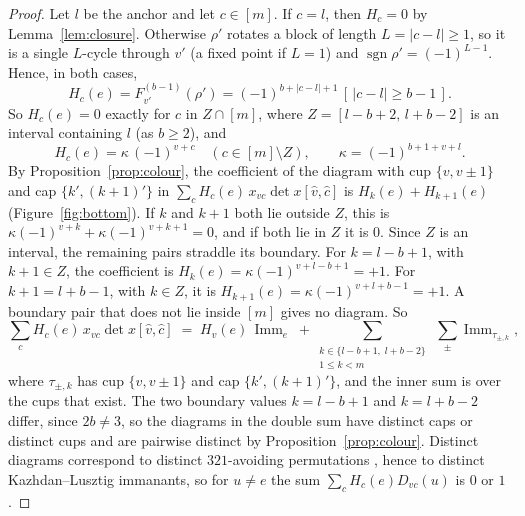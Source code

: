 \documentclass[11pt]{amsart}
\theoremstyle{definition}
\theoremstyle{remark}
\newcommand{\Imm}{\operatorname{Imm}}
\newcommand{\sgn}{\operatorname{sgn}}
\begin{document}
\begin{proof}
Let $l$ be the anchor and let $c\in[m]$. If $c=l$, then $H_c=0$ by Lemma~\ref{lem:closure}. Otherwise $\rho'$ rotates a block of length $L=|c-l|\ge1$, so it is a single $L$-cycle through $v'$ (a fixed point if $L=1$) and $\sgn\rho'=(-1)^{L-1}$. Hence, in both cases,
\[
H_c(e)=F^{(b-1)}_{v'}(\rho')=(-1)^{b+|c-l|+1}\,[\,|c-l|\ge b-1\,].
\]
So $H_c(e)=0$ exactly for $c$ in $Z\cap[m]$, where $Z=[l-b+2,\,l+b-2]$ is an interval containing $l$ (as $b\ge2$), and
\[
H_c(e)=\kappa\,(-1)^{v+c}\quad(c\in[m]\setminus Z),\qquad \kappa=(-1)^{b+1+v+l}.
\]
By Proposition~\ref{prop:colour}, the coefficient of the diagram with cup $\{v,v\pm1\}$ and cap $\{k',(k+1)'\}$ in $\sum_cH_c(e)\,x_{vc}\det x[\hat v,\hat c]$ is $H_k(e)+H_{k+1}(e)$ (Figure~\ref{fig:bottom}). If $k$ and $k+1$ both lie outside $Z$, this is $\kappa(-1)^{v+k}+\kappa(-1)^{v+k+1}=0$, and if both lie in $Z$ it is $0$. Since $Z$ is an interval, the remaining pairs straddle its boundary. For $k=l-b+1$, with $k+1\in Z$, the coefficient is $H_k(e)=\kappa(-1)^{v+l-b+1}=+1$. For $k+1=l+b-1$, with $k\in Z$, it is $H_{k+1}(e)=\kappa(-1)^{v+l+b-1}=+1$. A boundary pair that does not lie inside $[m]$ gives no diagram. So
\[
\sum_cH_c(e)\,x_{vc}\det x[\hat v,\hat c]\;=\;H_v(e)\,\Imm_e\;+\sum_{\substack{k\in\{l-b+1,\;l+b-2\}\\1\le k<m}}\ \sum_{\pm}\Imm_{\tau_{\pm,k}},
\]
where $\tau_{\pm,k}$ has cup $\{v,v\pm1\}$ and cap $\{k',(k+1)'\}$, and the inner sum is over the cups that exist. The two boundary values $k=l-b+1$ and $k=l+b-2$ differ, since $2b\ne3$, so the diagrams in the double sum have distinct caps or distinct cups and are pairwise distinct by Proposition~\ref{prop:colour}. Distinct diagrams correspond to distinct $321$-avoiding permutations \cite{FG}, hence to distinct Kazhdan--Lusztig immanants, so for $u\ne e$ the sum $\sum_cH_c(e)D_{vc}(u)$ is $0$ or $1$.
\end{proof}
\end{document}
